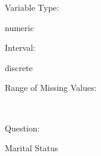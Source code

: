 \documentclass[
]{article}
\begin{document}
\begin{minipage}[t]{0.3\linewidth}

Variable Type:

\end{minipage}%
\begin{minipage}[t]{0.7\linewidth}

numeric

\end{minipage}

\begin{minipage}[t]{0.3\linewidth}

Interval:

\end{minipage}%
\begin{minipage}[t]{0.7\linewidth}

discrete

\end{minipage}

\begin{minipage}[t]{0.3\linewidth}

Range of Missing Values:

\end{minipage}%
\begin{minipage}[t]{0.7\linewidth}

~

\end{minipage}

\begin{minipage}[t]{0.3\linewidth}

Question:

\end{minipage}%
\begin{minipage}[t]{0.7\linewidth}

Marital Status

\end{minipage}
\end{document}
